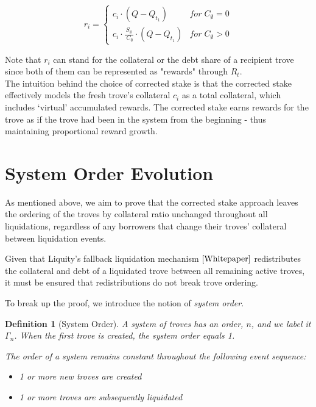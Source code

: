 \documentclass[reqno]{article}
\newtheorem{definition}{Definition}[section]
\begin{document}
\begin{equation}
    r_i=
        \begin{cases} 
            c_i \cdot (Q - Q_{t_1}) & for \;C_\emptyset = 0\\
            c_i \cdot \frac{S_\emptyset} {\;C_\emptyset} \cdot (Q - Q_{t_1}) & for \;C_\emptyset>0
        \end{cases}
\end{equation}

Note that $r_i$ can stand for the collateral or the debt share of a recipient trove since both of them can be represented as "rewards" through $R_t$. \\

The intuition behind the choice of corrected stake is that the corrected stake effectively models the fresh trove’s collateral $c_i$ as a total collateral, which includes ‘virtual’ accumulated rewards. The corrected stake earns rewards for the trove as if the trove had been in the system from the beginning - thus maintaining proportional reward growth.\\

\section{System Order Evolution}

As mentioned above, we aim to prove that the corrected stake approach leaves the ordering of the troves by collateral ratio unchanged throughout all liquidations, regardless of any borrowers that change their troves' collateral between liquidation events.

Given that Liquity's fallback liquidation mechanism $\cite{Whitepaper}$ redistributes the collateral and debt of a liquidated trove between all remaining active troves, it must be  ensured that redistributions do not break trove ordering.

To break up the proof, we introduce the notion of \textit{system order}. 

\begin{definition}[System Order]
  A system of troves has an order, $n$, and we label it $\Gamma_n$. When the first trove is created, the system order equals 1.

  The order of a system remains constant throughout the following event sequence:

\begin{itemize}
  \item 1 or more new troves are created 
  \item 1 or more troves are subsequently liquidated
\end{itemize}
\end{definition}
\end{document}
